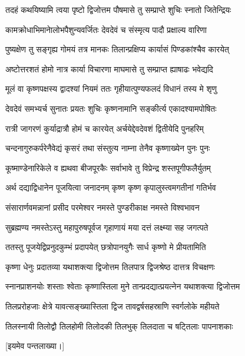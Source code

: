 \twolineshloka
{तदहं कथयिष्यामि त्वया पृष्टो द्विजोत्तम}
{पौषमासे तु सम्प्राप्ते शुचिः स्नातो जितेन्द्रियः} %

\twolineshloka
{कामक्रोधाभिमानेालोभपैशुन्यवर्जितः}
{देवदेवं च संस्मृत्य पादौ प्रक्षाल्य वारिणा} %

\twolineshloka
{पुष्यक्षेण तु सङ्गृह्य गोमयं तत्र मानकः}
{तिलान्प्रक्षिप्य कार्यासं पिण्डकांश्चैव कारयेत्} %

\twolineshloka
{अष्टोत्तरशतं होमो नात्र कार्या विचारणा}
{माघमासे तु सम्प्राप्त ह्याषाढः भवेद्यदि} %

\twolineshloka
{मूलं वा कृष्णपक्षस्य द्वादश्यां नियमं ततः}
{गृहीयात्पुण्यफलदं विधानं तस्य मे शृणु} %

\twolineshloka
{देवदेवं समभ्यर्च सुनातः प्रयतः शुचिः}
{कृष्णनामानि सङ्कीर्त्य एकादश्यामपोषितः} %

\twolineshloka
{रात्री जागरणं कुर्याद्रात्रौ होमं च कारयेत्}
{अर्चयेद्देवदेवशं द्वितीयेदि पुनहरिम्} %

\twolineshloka
{चन्दनागुरुकर्परेनैवेद्यं कृसरं तथा}
{संस्तुत्य नाम्ना तेनैव कृष्णाख्येन पुनः पुनः} %

\twolineshloka
{कूष्माण्डेनारिकेले व ह्यथवा बीजपूरकैः}
{सर्वाभावे तु विप्रेन्द्र शस्तपूगीफलैर्युतम्} %

\twolineshloka
{अर्थ दद्याद्विधानेन पूजयित्वा जनादनम्}
{कृष्ण कृष्ण कृपालुस्त्वमगतीनां गतिर्भव} %

\twolineshloka
{संसारार्णवमन्नानां प्रसीद परमेश्वर}
{नमस्ते पुण्डरीकाक्ष नमस्ते विश्वभावन} %

\twolineshloka
{सुब्रह्मण्य नमस्तेऽस्तु महापुरुषपूर्वज}
{गृहाणायं मया दत्तं लक्ष्म्या सह जगत्पते} %

\twolineshloka
{ततस्तु पूजयेद्विप्रनुदकुम्भं प्रदापयेत्}
{छत्रोपानयुगैः सार्ध कृष्णो मे प्रीयतामिति} %

\twolineshloka
{कृष्णा धेनुः प्रदातव्या यथाशक्त्या द्विजोत्तम}
{तिलपात्र द्विजश्रेष्ठ दात्तत्र विचक्षणः} %

\twolineshloka
{स्नानप्राशनयोः शस्ताः श्वेताः कृष्णास्तिला मुने}
{तान्प्रदद्यात्प्रयत्नेन यथाशक्त्या द्विजोत्तम} %

\twolineshloka
{तिलप्ररोहजाः क्षेत्रे यावत्सङ्ख्यास्तिला द्विज}
{तावद्वर्षसहस्राणि स्वर्गलोके महीयते} %

\twolineshloka
{तिलस्नायी तिलोद्वौ तिलहोमी तिलोदकी}
{तिलभुक् तिलदाता च षट्तिलाः पापनाशकाः} %

[इयमेव पन्तलाख्या।]


